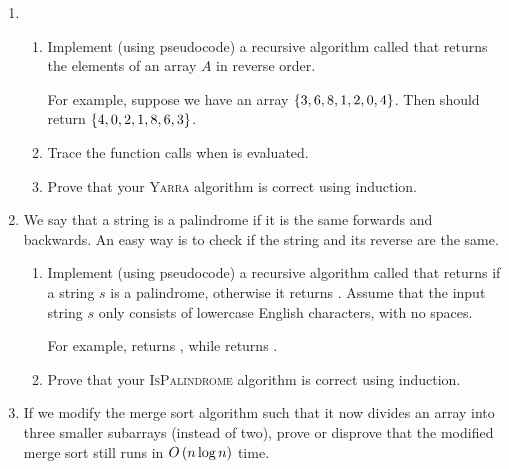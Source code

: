 \begin{exercises}
\begin{enumerate}
    \item 
    \begin{enumerate}
        \item Implement (using pseudocode) a recursive algorithm called  that returns the elements of an array $A$ in reverse order.
    
        For example, suppose we have an array $\left\{3,6,8,1,2,0,4\right\}$. Then  should return $\left\{4,0,2,1,8,6,3\right\}$.
        
        \item Trace the function calls when  is evaluated.
        
        \item Prove that your \textsc{Yarra} algorithm is correct using induction.
    \end{enumerate}
    
    \item We say that a string is a palindrome if it is the same forwards and backwards. An easy way is to check if the string and its reverse are the same.
    
    \begin{enumerate}
        \item Implement (using pseudocode) a recursive algorithm called  that returns \algtrue{} if a string $s$ is a palindrome, otherwise it returns \algfalse{}. Assume that the input string $s$ only consists of lowercase English characters, with no spaces. 
        
        For example,  returns \algtrue{}, while  returns \algfalse{}.
        
        \item Prove that your \textsc{IsPalindrome} algorithm is correct using induction.
    \end{enumerate}
    
    \item If we modify the merge sort algorithm such that it now divides an array into three smaller subarrays (instead of two), prove or disprove that the modified merge sort still runs in $O\left(n \log n \right)$ time.


\end{enumerate}
\end{exercises}
